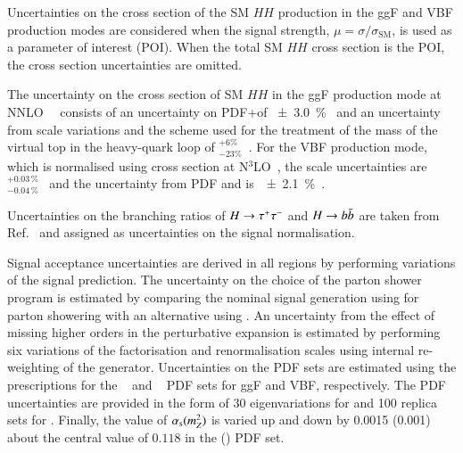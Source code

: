 Uncertainties on the cross section of the SM $HH$ production in the
ggF and VBF production modes are considered when the signal strength,
$\mu = \sigma / \sigma_{\text{SM}}$, is used as a parameter of
interest (POI). When the total SM $HH$ cross section is the POI, the
cross section uncertainties are omitted.

The uncertainty on the cross section of SM $HH$ in the ggF production
mode at NNLO~\FTapprox~\cite{Grazzini:2018bsd} consists of an
uncertainty on PDF+\alphas of \SI{\pm 3.0}{\percent}~\cite{LHCHWGHH}
and an uncertainty from scale variations and the scheme used for the
treatment of the mass of the virtual top in the heavy-quark loop of
$^{+6\%}_{-23\%}$~\cite{Baglio:2020wgt}. For the VBF production mode,
which is normalised using cross section at
N$^3$LO~\cite{Dreyer:2018qbw}, the scale uncertainties
are~$^{+0.03\,\%}_{-0.04\,\%}$~\cite{LHCHWGHH} and the uncertainty from
PDF and \alphas is~\SI{\pm 2.1}{\percent}~\cite{LHCHWGHH}.

Uncertainties on the branching ratios of $H \to \tau^{+} \tau^{-}$ and
$H \to b\bar{b}$ are taken from Ref.~\cite{deFlorian:2016spz} and
assigned as uncertainties on the signal normalisation.

Signal acceptance uncertainties are derived in all regions by
performing variations of the signal prediction.
The uncertainty on the choice of the parton shower program is
estimated by comparing the nominal signal generation using
\PYTHIA[8.244] for parton showering with an alternative using
\HERWIG[7.1.6]. An uncertainty from the effect of missing higher
orders in the perturbative expansion is estimated by performing six
variations of the factorisation and renormalisation scales using
internal re-weighting of the generator. Uncertainties on the PDF sets
are estimated using the prescriptions for the
\PDFforLHC[15nlo]~\cite{Butterworth:2015oua} and
\NNPDF[3.0nlo]~\cite{Ball:2014uwa} PDF sets for ggF and VBF,
respectively. The PDF uncertainties are provided in the form of 30
eigenvariations for \PDFforLHC[15nlo] and 100 replica sets for
\NNPDF[3.0nlo]. Finally, the value of $\alpha_{\text{s}}(m_{Z}^2)$ is varied up
and down by 0.0015 (0.001) about the central value of $0.118$ in the
\PDFforLHC[15nlo] (\NNPDF[3.0nlo]) PDF set.


